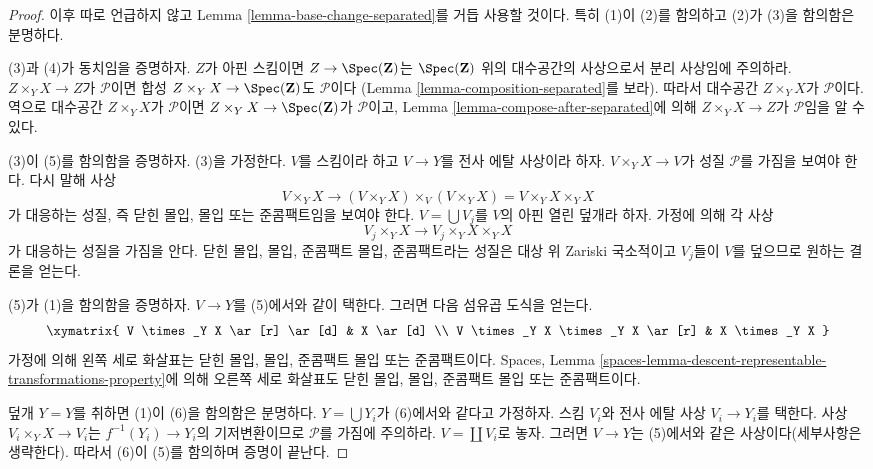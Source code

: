 \begin{proof}
이후 따로 언급하지 않고 Lemma \ref{lemma-base-change-separated}를
거듭 사용할 것이다. 특히 (1)이 (2)를 함의하고 (2)가 (3)을
함의함은 분명하다.

\medskip\noindent
(3)과 (4)가 동치임을 증명하자. $Z$가 아핀 스킴이면
$Z \to \Spec(\mathbf{Z})$는 $\Spec(\mathbf{Z})$ 위의 대수공간의
사상으로서 분리 사상임에 주의하라.
$Z \times_Y X \to Z$가 $\mathcal{P}$이면 합성
$Z \times_Y X \to \Spec(\mathbf{Z})$도 $\mathcal{P}$이다
(Lemma \ref{lemma-composition-separated}를 보라).
따라서 대수공간 $Z \times_Y X$가 $\mathcal{P}$이다.
역으로 대수공간 $Z \times_Y X$가 $\mathcal{P}$이면
$Z \times_Y X \to \Spec(\mathbf{Z})$가 $\mathcal{P}$이고,
Lemma \ref{lemma-compose-after-separated}에 의해
$Z \times_Y X \to Z$가 $\mathcal{P}$임을 알 수 있다.

\medskip\noindent
(3)이 (5)를 함의함을 증명하자. (3)을 가정한다. $V$를 스킴이라 하고
$V \to Y$를 전사 에탈 사상이라 하자. $V \times_Y X \to V$가
성질 $\mathcal{P}$를 가짐을 보여야 한다. 다시 말해 사상
$$
V \times_Y X \longrightarrow
(V \times_Y X) \times_V (V \times_Y X) = V \times_Y X \times_Y X
$$
가 대응하는 성질, 즉 닫힌 몰입, 몰입 또는 준콤팩트임을 보여야 한다.
$V = \bigcup V_j$를 $V$의 아핀 열린 덮개라 하자.
가정에 의해 각 사상
$$
V_j \times_Y X \longrightarrow V_j \times_Y X \times_Y X
$$
가 대응하는 성질을 가짐을 안다. 닫힌 몰입, 몰입, 준콤팩트 몰입,
준콤팩트라는 성질은 대상 위 Zariski 국소적이고 $V_j$들이 $V$를
덮으므로 원하는 결론을 얻는다.

\medskip\noindent
(5)가 (1)을 함의함을 증명하자. $V \to Y$를 (5)에서와 같이 택한다.
그러면 다음 섬유곱 도식을 얻는다.
$$
\xymatrix{
V \times_Y X \ar[r] \ar[d] &
X \ar[d] \\
V \times_Y X \times_Y X \ar[r] &
X \times_Y X
}
$$
가정에 의해 왼쪽 세로 화살표는 닫힌 몰입, 몰입, 준콤팩트 몰입 또는
준콤팩트이다. Spaces, Lemma
\ref{spaces-lemma-descent-representable-transformations-property}에 의해
오른쪽 세로 화살표도 닫힌 몰입, 몰입, 준콤팩트 몰입 또는
준콤팩트이다.

\medskip\noindent
덮개 $Y = Y$를 취하면 (1)이 (6)을 함의함은 분명하다.
$Y = \bigcup Y_i$가 (6)에서와 같다고 가정하자.
스킴 $V_i$와 전사 에탈 사상 $V_i \to Y_i$를 택한다.
사상 $V_i \times_Y X \to V_i$는 $f^{-1}(Y_i) \to Y_i$의
기저변환이므로 $\mathcal{P}$를 가짐에 주의하라.
$V = \coprod V_i$로 놓자. 그러면 $V \to Y$는 (5)에서와 같은
사상이다(세부사항은 생략한다). 따라서 (6)이 (5)를 함의하며
증명이 끝난다.
\end{proof}

